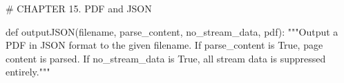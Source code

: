 # CHAPTER 15. PDF and JSON

def outputJSON(filename, parse_content, no_stream_data, pdf):
    """Output a PDF in JSON format to the given filename. If parse_content is
    True, page content is parsed. If no_stream_data is True, all stream data is
    suppressed entirely."""
